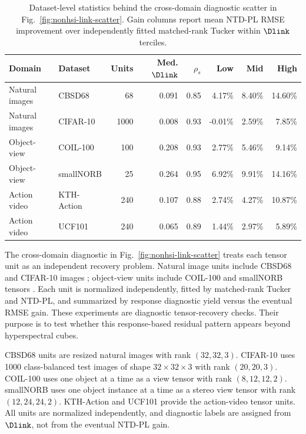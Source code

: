 \begin{table}[!t]
  \centering
  \caption{Dataset-level statistics behind the cross-domain diagnostic scatter
  in Fig.~\ref{fig:nonhsi-link-scatter}. Gain columns report mean NTD-PL RMSE
  improvement over independently fitted matched-rank Tucker within
  \(\Dlink\) terciles.}
  \label{tab:app-nonhsi-link-diagnostic-stats}
  \scriptsize
  \renewcommand{\arraystretch}{1.08}
  \setlength{\tabcolsep}{4.5pt}
  \begin{tabular*}{\textwidth}{@{\extracolsep{\fill}}llrrrrrr@{}}
  \toprule
  Domain & Dataset & Units & Med. \(\Dlink\) &
  \(\rho_s\) & Low & Mid & High \\
  \midrule
  Natural images & CBSD68 & 68 & 0.091 & 0.85 & 4.17\% & 8.40\% & 14.60\% \\
  Natural images & CIFAR-10 & 1000 & 0.008 & 0.93 & -0.01\% & 2.59\% & 7.85\% \\
  Object-view & COIL-100 & 100 & 0.208 & 0.93 & 2.77\% & 5.46\% & 9.14\% \\
  Object-view & smallNORB & 25 & 0.264 & 0.95 & 6.92\% & 9.91\% & 14.16\% \\
  Action video & KTH-Action & 240 & 0.107 & 0.88 & 2.74\% & 4.27\% & 10.87\% \\
  Action video & UCF101 & 240 & 0.065 & 0.89 & 1.44\% & 2.97\% & 5.89\% \\
  \bottomrule
  \end{tabular*}
\end{table}

The cross-domain diagnostic in Fig.~\ref{fig:nonhsi-link-scatter} treats each
tensor unit as an independent recovery problem. Natural image units include
CBSD68 and CIFAR-10 images \cite{martin2001database,krizhevsky2009learning};
object-view units include COIL-100 and smallNORB tensors
\cite{nene1996coil100,LeCun2004SmallNORB}. Each unit is normalized
independently, fitted by matched-rank Tucker and NTD-PL, and summarized by
response diagnostic yield versus the eventual RMSE gain. These
experiments are diagnostic tensor-recovery checks. Their purpose is to test
whether this response-based residual pattern appears beyond hyperspectral
cubes.

CBSD68 units are resized natural images with rank \((32,32,3)\). CIFAR-10 uses
1000 class-balanced test images of shape \(32\times32\times3\) with rank
\((20,20,3)\). COIL-100 uses one object at a time as a view tensor with rank
\((8,12,12,2)\). smallNORB uses one object instance at a time as a stereo view
tensor with rank \((12,24,24,2)\). KTH-Action \cite{Schuldt2004KTHActions} and
UCF101 \cite{Soomro2012UCF101} provide the action-video tensor units. All
units are normalized independently, and diagnostic labels are assigned from
\(\Dlink\), not from the eventual NTD-PL gain.

